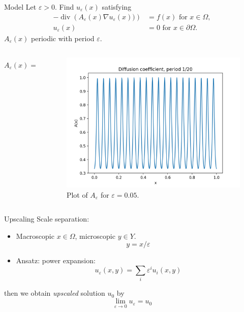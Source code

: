 \documentclass{beamer}
\renewcommand{\epsilon}{\varepsilon}
\renewcommand{\div}[1]{\operatorname{div}\left( #1 \right)}
\begin{document}
\begin{frame}[t]{Model}
    Let $\varepsilon>0$. Find $u_\varepsilon(x)$ satisfying
    \begin{equation}
        \begin{split}
            -\div{A_\varepsilon(x)\nabla u_\varepsilon(x))} &= f(x) \mbox{ for } x \in \Omega,\\
            u_\varepsilon(x) &= 0 \mbox{ for } x \in \partial\Omega.
        \end{split}
        \label{eq:model}
    \end{equation}
     $A_\varepsilon(x)$ periodic with period $\varepsilon$.
     \begin{columns}
         \begin{column}[c]{.5\textwidth}
             \[A_\varepsilon(x)= \frac{1}{2+\cos \left( \frac{2\pi x}{\epsilon} \right)}\]
         \end{column}
         \begin{column}[c]{.5\textwidth}
             \begin{figure}[th]
                \centering
                \includegraphics[width=0.9\linewidth]{a_eps.png}
                \caption{Plot of $A_\epsilon$ for $\epsilon=0.05$.}
                \label{fig:one_dim_exact}
            \end{figure}
         \end{column}
     \end{columns}

\end{frame}

\begin{frame}[t]{Upscaling}
    Scale separation: \begin{itemize}
        \item Macroscopic $x \in \Omega$, microscopic $y \in Y$.
        \[y= x/\varepsilon\]
        \item Ansatz: power expansion:
        \[u_\varepsilon(x,y) = \sum_i \varepsilon^i u_i(x,y)\]
    \end{itemize}
    then we obtain \emph{upscaled} solution $u_0$ by
    \[\lim_{\varepsilon\to 0} u_\varepsilon = u_0\]
\end{frame}
\end{document}
